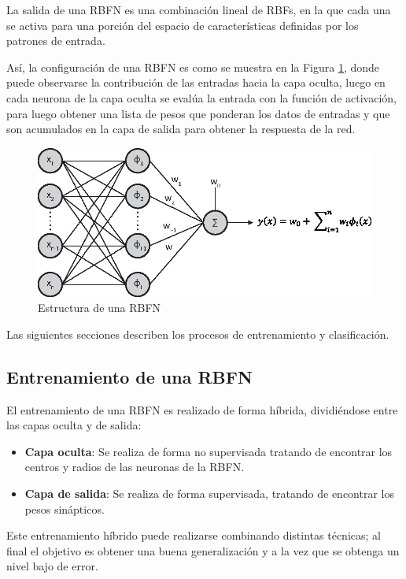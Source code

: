 \documentclass[journal]{IEEEtran}
\begin{document}
La salida de una RBFN es una combinación lineal de RBFs, en la que cada una se activa para una porción del espacio de características definidas por los patrones de entrada.

Así, la configuración de una RBFN es como se muestra en la Figura \ref{fig:estructura-rbfn}, donde puede observarse la contribución de las entradas hacia la capa oculta, luego en cada neurona de la capa oculta se evalúa la entrada con la función de activación, para luego obtener una lista de pesos que ponderan los datos de entradas y que son acumulados en la capa de salida para obtener la respuesta de la red.
\begin{figure}[tb]
    \centering
    \includegraphics[width=\columnwidth]{imagenes/rbfn}
    \caption{Estructura de una RBFN}
    \label{fig:estructura-rbfn}
\end{figure}

Las siguientes secciones describen los procesos de entrenamiento y clasificación.
\subsection{Entrenamiento de una RBFN} %
\label{sub:entrenamiento_de_una_RNA}
El entrenamiento de una RBFN es realizado de forma híbrida, dividiéndose entre las capas oculta y de salida:
\begin{itemize}
	\item \textbf{Capa oculta}: Se realiza de forma no supervisada tratando de encontrar los centros y radios de las neuronas de la RBFN.
	\item \textbf{Capa de salida}: Se realiza de forma supervisada, tratando de encontrar los pesos sinápticos.
\end{itemize}

Este entrenamiento híbrido puede realizarse combinando distintas técnicas; al final el objetivo es obtener una buena generalización y a la vez que se obtenga un nivel bajo de error.
\end{document}
